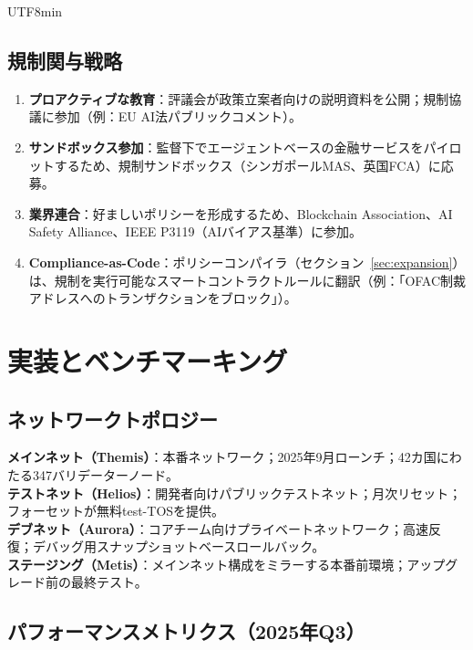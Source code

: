 \documentclass[11pt]{article}
\begin{document}
\begin{CJK}{UTF8}{min}
\begin{itemize}[noitemsep]
\subsection{規制関与戦略}

\begin{enumerate}[noitemsep]
  \item \textbf{プロアクティブな教育}：評議会が政策立案者向けの説明資料を公開；規制協議に参加（例：EU AI法パブリックコメント）。
  \item \textbf{サンドボックス参加}：監督下でエージェントベースの金融サービスをパイロットするため、規制サンドボックス（シンガポールMAS、英国FCA）に応募。
  \item \textbf{業界連合}：好ましいポリシーを形成するため、Blockchain Association、AI Safety Alliance、IEEE P3119（AIバイアス基準）に参加。
  \item \textbf{Compliance-as-Code}：ポリシーコンパイラ（セクション~\ref{sec:expansion}）は、規制を実行可能なスマートコントラクトルールに翻訳（例：「OFAC制裁アドレスへのトランザクションをブロック」）。
\end{enumerate}

\section{実装とベンチマーキング}
\label{sec:implementation}

\subsection{ネットワークトポロジー}

\textbf{メインネット（Themis）}：本番ネットワーク；2025年9月ローンチ；42カ国にわたる347バリデーターノード。\\
\textbf{テストネット（Helios）}：開発者向けパブリックテストネット；月次リセット；フォーセットが無料test-TOSを提供。\\
\textbf{デブネット（Aurora）}：コアチーム向けプライベートネットワーク；高速反復；デバッグ用スナップショットベースロールバック。\\
\textbf{ステージング（Metis）}：メインネット構成をミラーする本番前環境；アップグレード前の最終テスト。

\subsection{パフォーマンスメトリクス（2025年Q3）}


\end{itemize}
\end{CJK}
\end{document}
